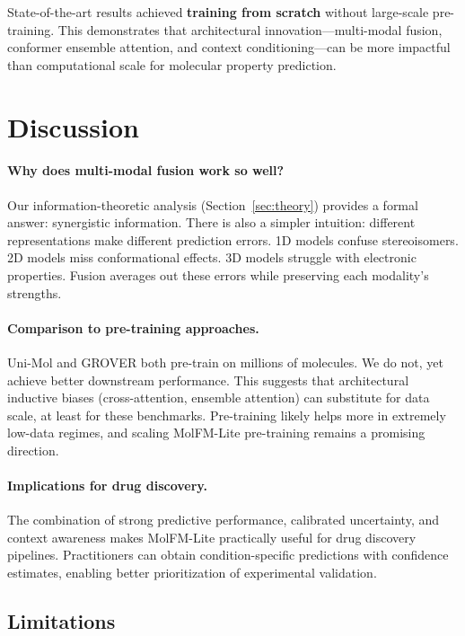 \documentclass[11pt]{article}
\newcommand{\modelname}{MolFM-Lite}
\begin{document}
State-of-the-art results achieved \textbf{training from scratch} without large-scale pre-training. This demonstrates that architectural innovation---multi-modal fusion, conformer ensemble attention, and context conditioning---can be more impactful than computational scale for molecular property prediction.

\section{Discussion}
\label{sec:discussion}

\paragraph{Why does multi-modal fusion work so well?}
Our information-theoretic analysis (Section~\ref{sec:theory}) provides a formal answer: synergistic information. There is also a simpler intuition: different representations make different prediction errors. 1D models confuse stereoisomers. 2D models miss conformational effects. 3D models struggle with electronic properties. Fusion averages out these errors while preserving each modality's strengths.

\paragraph{Comparison to pre-training approaches.}
Uni-Mol and GROVER both pre-train on millions of molecules. We do not, yet achieve better downstream performance. This suggests that architectural inductive biases (cross-attention, ensemble attention) can substitute for data scale, at least for these benchmarks. Pre-training likely helps more in extremely low-data regimes, and scaling \modelname{} pre-training remains a promising direction.

\paragraph{Implications for drug discovery.}
The combination of strong predictive performance, calibrated uncertainty, and context awareness makes \modelname{} practically useful for drug discovery pipelines. Practitioners can obtain condition-specific predictions with confidence estimates, enabling better prioritization of experimental validation.

\subsection{Limitations}
\end{document}
